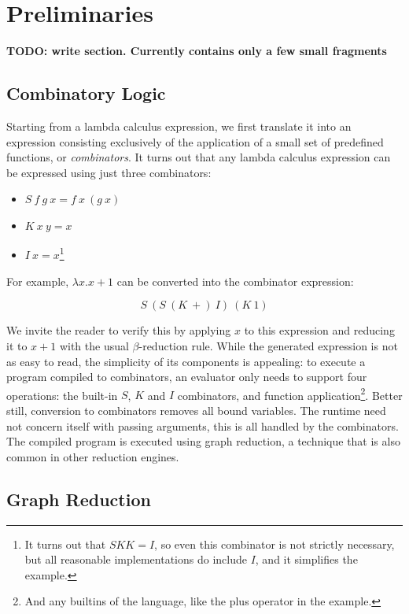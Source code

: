 \documentclass[conference]{IEEEtran}
\begin{document}
\section{Preliminaries}
\label{sec:prelim}
\textbf{TODO: write section. Currently contains only a few small fragments}
\subsection{Combinatory Logic}
Starting from a lambda calculus expression, we first translate it into an expression consisting exclusively of the application of a small set of predefined functions, or \textit{combinators}.
It turns out that any lambda calculus expression can be expressed using just three combinators:
\begin{itemize}
    \item $S \ f \ g \ x = f \ x \ (g \ x)$
    \item $K \ x \ y = x$
    \item $I \ x = x$\footnote{It turns out that $SKK = I$, so even this combinator is not strictly necessary, but all reasonable implementations do include $I$, and it simplifies the example.}
\end{itemize}

For example, $\lambda x.x+1$ can be converted into the combinator expression:

\[
    S \ (S \  (K \  +) \  I) \ (K \ 1)
\]

We invite the reader to verify this by applying $x$ to this expression and reducing it to $x+1$ with the usual $\beta$-reduction rule.
While the generated expression is not as easy to read, the simplicity of its components is appealing: to execute a program compiled to combinators, an evaluator only needs to support four operations: the built-in $S$, $K$ and $I$ combinators, and function application\footnote{And any builtins of the language, like the plus operator in the example.}.
Better still, conversion to combinators removes all bound variables.
The runtime need not concern itself with passing arguments, this is all handled by the combinators.
The compiled program is executed using graph reduction, a technique that is also common in other reduction engines\cite{kieburtz_g-machine_1985,fairbairn_tim_1987}.

\subsection{Graph Reduction}
\end{document}
